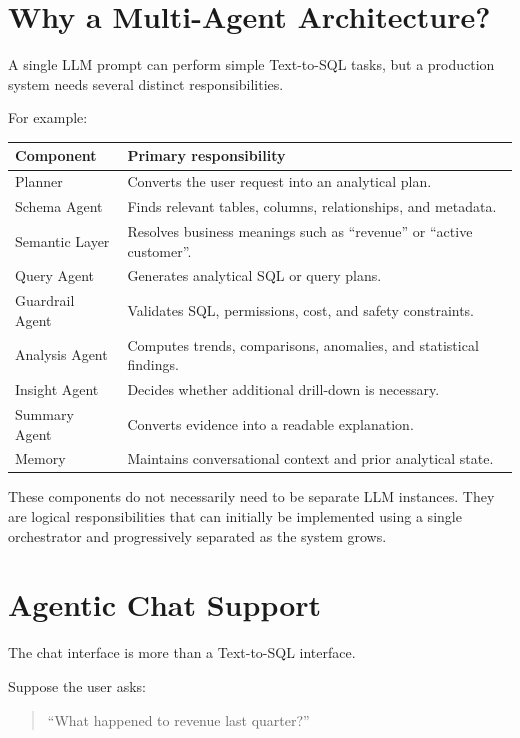 \documentclass[11pt,a4paper]{article}
\begin{document}
\section{Why a Multi-Agent Architecture?}

A single LLM prompt can perform simple Text-to-SQL tasks, but a production
system needs several distinct responsibilities.

For example:

\begin{longtable}{p{} p{}}
\toprule
\textbf{Component} & \textbf{Primary responsibility}\\
\midrule
Planner & Converts the user request into an analytical plan.\\
Schema Agent & Finds relevant tables, columns, relationships, and metadata.\\
Semantic Layer & Resolves business meanings such as ``revenue'' or ``active customer''.\\
Query Agent & Generates analytical SQL or query plans.\\
Guardrail Agent & Validates SQL, permissions, cost, and safety constraints.\\
Analysis Agent & Computes trends, comparisons, anomalies, and statistical findings.\\
Insight Agent & Decides whether additional drill-down is necessary.\\
Summary Agent & Converts evidence into a readable explanation.\\
Memory & Maintains conversational context and prior analytical state.\\
\bottomrule
\end{longtable}

These components do not necessarily need to be separate LLM instances.
They are logical responsibilities that can initially be implemented using a
single orchestrator and progressively separated as the system grows.

\section{Agentic Chat Support}

The chat interface is more than a Text-to-SQL interface.

Suppose the user asks:

\begin{quote}
``What happened to revenue last quarter?''
\end{quote}
\end{document}
